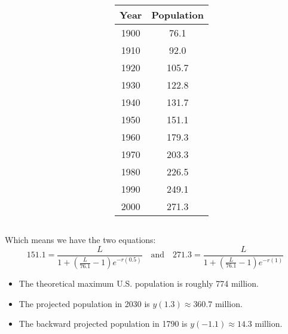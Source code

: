 \documentclass{beamer}
\begin{document}
\begin{frame}
\begin{example}
\begin{overprint}
\begin{columns}
\begin{column}{0.7\linewidth}
\vspace{2mm}
\end{column}
\begin{column}{0.28\linewidth}
\begin{tabular}{|cc|}
\hline
Year & Population \\
\hline
1900 & \phantom{1}76.1 \\
1910 & \phantom{1}92.0 \\
1920 & 105.7 \\
1930 & 122.8 \\
1940 & 131.7 \\
1950 & 151.1 \\
1960 & 179.3 \\
1970 & 203.3 \\
1980 & 226.5 \\
1990 & 249.1 \\
2000 & 271.3 \\
\hline
\end{tabular}
\end{column}
\end{columns}
Which means we have the two equations:
\begin{equation*}
151.1=\dfrac{L}{1+\left(\tfrac{L}{76.1}-1\right)e^{-r(0.5)}}
\quad\text{and}\quad
271.3=\dfrac{L}{1+\left(\tfrac{L}{76.1}-1\right)e^{-r(1)}}
\end{equation*}

\vspace{2mm}

\vspace{-2mm}
\begin{itemize}
\item<8-> The theoretical maximum U.S. population is roughly 774 million.
\item<9-> The projected population in 2030 is $y(1.3)\approx 360.7$ million.
\item<10-> The backward projected population in 1790 is $y(-1.1)\approx 14.3$ million. 
\end{itemize}
\end{overprint}
\end{example}
\end{frame}
\end{document}
